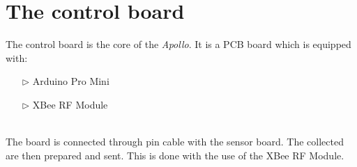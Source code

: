 \documentclass[12pt,a4paper,draft]{report}
\begin{document}
\section{The control board}
The control board is the core of the \emph{Apollo}. It is a PCB board which is equipped with:
\begin{itemize}
\item[$\triangleright$]Arduino Pro Mini
\item[$\triangleright$]XBee RF Module
\end{itemize}
% 
\ \\
The board is connected through pin cable with the sensor board. The collected are then prepared and sent. This is done with the use of the XBee RF Module.\\
%
\end{document}
